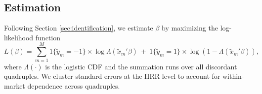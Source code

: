 \documentclass[12pt]{article}
\begin{document}
\subsection{Estimation}
\label{sec:estimation}

Following Section \ref{sec:identification}, we estimate $\beta$ by maximizing the log-likelihood function
\begin{equation}\label{eq:likelihood}
 L(\beta) = \sum_{m=1}^M 1\{\tilde{y}_m=-1\} \times \log \Lambda(\tilde{x}_m'\beta) \ + \ 1\{\tilde{y}_m=1\} \times \log (1-\Lambda(\tilde{x}_m'\beta)),
\end{equation}
where $\Lambda(\cdot)$ is the logistic CDF and the summation runs over all discordant quadruples. We cluster standard errors at the HRR level to account for within-market dependence across quadruples.
\end{document}
